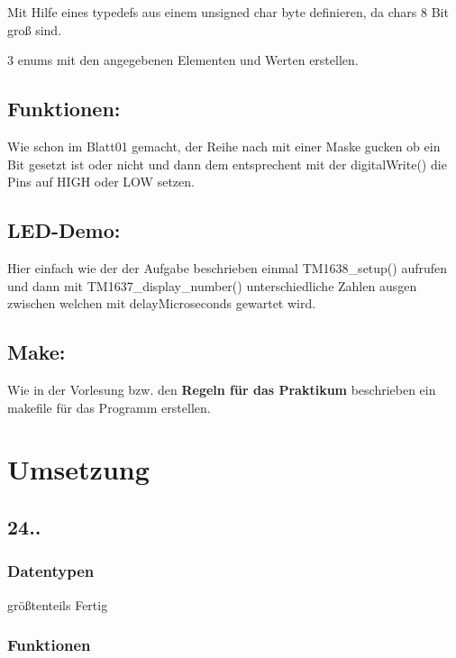 \begin{DoxyEnumerate}
\item Mit Hilfe eines typedefs aus einem unsigned char byte definieren, da chars 8 Bit groß sind.
\item 3 enums mit den angegebenen Elementen und Werten erstellen.
\end{DoxyEnumerate}\hypertarget{md_lerntagebuch_autotoc_md7}{}\subsection{Funktionen\+:}\label{md_lerntagebuch_autotoc_md7}
Wie schon im Blatt01 gemacht, der Reihe nach mit einer Maske gucken ob ein Bit gesetzt ist oder nicht und dann dem entsprechent mit der {\ttfamily digital\+Write()} die Pins auf H\+I\+GH oder L\+OW setzen.\hypertarget{md_lerntagebuch_autotoc_md8}{}\subsection{L\+E\+D-\/\+Demo\+:}\label{md_lerntagebuch_autotoc_md8}
Hier einfach wie der der Aufgabe beschrieben einmal {\ttfamily T\+M1638\+\_\+setup()} aufrufen und dann mit {\ttfamily T\+M1637\+\_\+display\+\_\+number()} unterschiedliche Zahlen ausgen zwischen welchen mit {\ttfamily delay\+Microseconds} gewartet wird.\hypertarget{md_lerntagebuch_autotoc_md9}{}\subsection{Make\+:}\label{md_lerntagebuch_autotoc_md9}
Wie in der Vorlesung bzw. den {\bfseries Regeln für das Praktikum} beschrieben ein makefile für das Programm erstellen.\hypertarget{md_lerntagebuch_autotoc_md10}{}\section{Umsetzung}\label{md_lerntagebuch_autotoc_md10}
\hypertarget{md_lerntagebuch_autotoc_md11}{}\subsection{24..}\label{md_lerntagebuch_autotoc_md11}
\hypertarget{md_lerntagebuch_autotoc_md12}{}\subsubsection{Datentypen}\label{md_lerntagebuch_autotoc_md12}

\begin{DoxyItemize}
\item größtenteils Fertig 
\end{DoxyItemize}\hypertarget{md_lerntagebuch_autotoc_md13}{}\subsubsection{Funktionen}\label{md_lerntagebuch_autotoc_md13}

